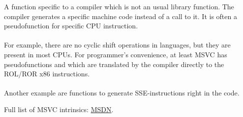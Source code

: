 \label{sec:compiler_intrinsic}


A function specific to a compiler which is not an usual library function.
The compiler generates a specific machine code instead of a call to it.
It is often a pseudofunction for specific \ac{CPU} instruction. \\
\\
For example, there are no cyclic shift operations in \CCpp languages, but they are present in most \ac{CPU}s.
For programmer's convenience, at least MSVC has pseudofunctions
 and \FNMSDNROTxURL{}
which are translated by the compiler directly to the ROL/ROR x86 instructions. \\
\\
Another example are functions to generate SSE-instructions right in the code.

Full list of MSVC intrinsics: \href{http://go.yurichev.com/17254}{MSDN}.

